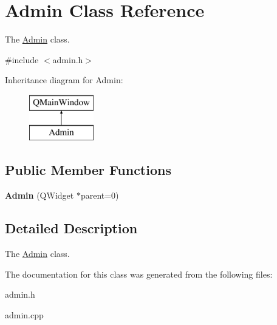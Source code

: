 \hypertarget{class_admin}{}\section{Admin Class Reference}
\label{class_admin}


The \hyperlink{class_admin}{Admin} class.  




{\ttfamily \#include $<$admin.\+h$>$}

Inheritance diagram for Admin\+:\begin{figure}[H]
\begin{center}
\leavevmode
\includegraphics[height=2.000000cm]{class_admin}
\end{center}
\end{figure}
\subsection*{Public Member Functions}
\begin{DoxyCompactItemize}
\item 
\mbox{\label{class_admin_a5e67a0ecb1fc8cd09c0f340b03be4016}} 
{\bfseries Admin} (Q\+Widget $\ast$parent=0)
\end{DoxyCompactItemize}


\subsection{Detailed Description}
The \hyperlink{class_admin}{Admin} class. 

The documentation for this class was generated from the following files\+:\begin{DoxyCompactItemize}
\item 
admin.\+h\item 
admin.\+cpp\end{DoxyCompactItemize}
